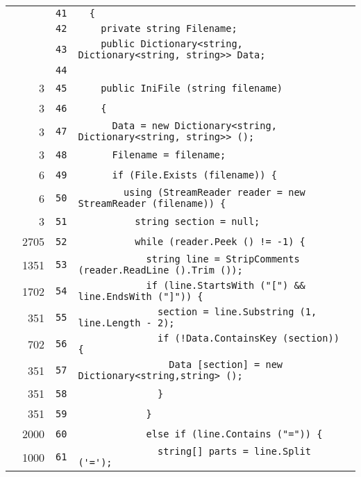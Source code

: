 \documentclass[a4paper,10pt]{article}
\begin{document}
\begin{longtable}[l]{lrrl}
\cellcolor{gray} &  & \verb~41~ & \verb~  {~\\
\cellcolor{gray} &  & \verb~42~ & \verb~    private string Filename;~\\
\cellcolor{gray} &  & \verb~43~ & \verb~    public Dictionary<string, Dictionary<string, string>> Data;~\\
\cellcolor{gray} &  & \verb~44~ & \verb~~\\
\cellcolor{green} & 3 & \verb~45~ & \verb~    public IniFile (string filename)~\\
\cellcolor{green} & 3 & \verb~46~ & \verb~    {~\\
\cellcolor{green} & 3 & \verb~47~ & \verb~      Data = new Dictionary<string, Dictionary<string, string>> ();~\\
\cellcolor{green} & 3 & \verb~48~ & \verb~      Filename = filename;~\\
\cellcolor{green} & 6 & \verb~49~ & \verb~      if (File.Exists (filename)) {~\\
\cellcolor{green} & 6 & \verb~50~ & \verb~        using (StreamReader reader = new StreamReader (filename)) {~\\
\cellcolor{green} & 3 & \verb~51~ & \verb~          string section = null;~\\
\cellcolor{green} & 2705 & \verb~52~ & \verb~          while (reader.Peek () != -1) {~\\
\cellcolor{green} & 1351 & \verb~53~ & \verb~            string line = StripComments (reader.ReadLine ().Trim ());~\\
\cellcolor{green} & 1702 & \verb~54~ & \verb~            if (line.StartsWith ("[") && line.EndsWith ("]")) {~\\
\cellcolor{green} & 351 & \verb~55~ & \verb~              section = line.Substring (1, line.Length - 2);~\\
\cellcolor{green} & 702 & \verb~56~ & \verb~              if (!Data.ContainsKey (section)) {~\\
\cellcolor{green} & 351 & \verb~57~ & \verb~                Data [section] = new Dictionary<string,string> ();~\\
\cellcolor{green} & 351 & \verb~58~ & \verb~              }~\\
\cellcolor{green} & 351 & \verb~59~ & \verb~            }~\\
\cellcolor{green} & 2000 & \verb~60~ & \verb~            else if (line.Contains ("=")) {~\\
\cellcolor{green} & 1000 & \verb~61~ & \verb~              string[] parts = line.Split ('=');~\\

\end{longtable}
\end{document}
